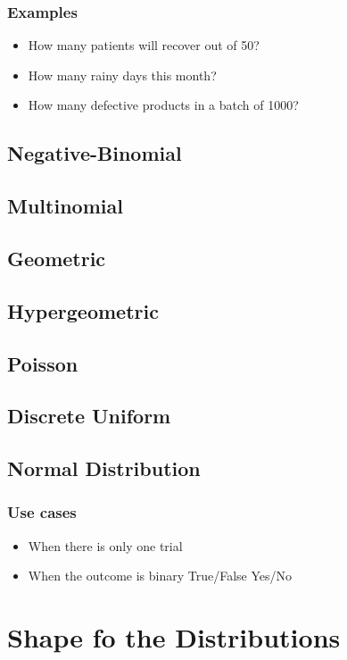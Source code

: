 \documentclass[12pt]{extarticle}
\begin{document}
\subsubsection{Examples}
\begin{itemize}
    \item How many patients will recover out of 50?
    \item How many rainy days this month?
    \item How many defective products in a batch of 1000?
\end{itemize}

\subsection{Negative-Binomial}
\subsection{Multinomial}
\subsection{Geometric}
\subsection{Hypergeometric}
\subsection{Poisson}
\subsection{Discrete Uniform}
\subsection{Normal Distribution}


\subsubsection{Use cases}
\begin{itemize}
    \item When there is only one trial
    \item When the outcome is binary True/False Yes/No 
\end{itemize}




\section{Shape fo the Distributions}
\end{document}
